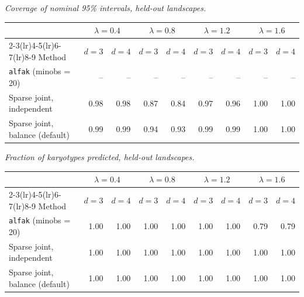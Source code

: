 \par\medskip\noindent\begin{minipage}{\linewidth}
\textit{Coverage of nominal 95\% intervals, held-out landscapes.}
\begin{center}
\footnotesize
\setlength{\tabcolsep}{3.5pt}
\begin{tabular}{l*{8}{r}}
\toprule
 & \multicolumn{2}{c}{$\lambda=0.4$} & \multicolumn{2}{c}{$\lambda=0.8$} & \multicolumn{2}{c}{$\lambda=1.2$} & \multicolumn{2}{c}{$\lambda=1.6$} \\
\cmidrule(lr){2-3}\cmidrule(lr){4-5}\cmidrule(lr){6-7}\cmidrule(lr){8-9}
Method & $d=3$ & $d=4$ & $d=3$ & $d=4$ & $d=3$ & $d=4$ & $d=3$ & $d=4$ \\
\midrule
\texttt{alfak} (minobs = 20) & -- & -- & -- & -- & -- & -- & -- & -- \\
Sparse joint, independent & 0.98 & 0.98 & 0.87 & 0.84 & 0.97 & 0.96 & 1.00 & 1.00 \\
Sparse joint, balance (default) & 0.99 & 0.99 & 0.94 & 0.93 & 0.99 & 0.99 & 1.00 & 1.00 \\
\bottomrule
\end{tabular}
\end{center}
\end{minipage}

\par\medskip\noindent\begin{minipage}{\linewidth}
\textit{Fraction of karyotypes predicted, held-out landscapes.}
\begin{center}
\footnotesize
\setlength{\tabcolsep}{3.5pt}
\begin{tabular}{l*{8}{r}}
\toprule
 & \multicolumn{2}{c}{$\lambda=0.4$} & \multicolumn{2}{c}{$\lambda=0.8$} & \multicolumn{2}{c}{$\lambda=1.2$} & \multicolumn{2}{c}{$\lambda=1.6$} \\
\cmidrule(lr){2-3}\cmidrule(lr){4-5}\cmidrule(lr){6-7}\cmidrule(lr){8-9}
Method & $d=3$ & $d=4$ & $d=3$ & $d=4$ & $d=3$ & $d=4$ & $d=3$ & $d=4$ \\
\midrule
\texttt{alfak} (minobs = 20) & 1.00 & 1.00 & 1.00 & 1.00 & 1.00 & 1.00 & 0.79 & 0.79 \\
Sparse joint, independent & 1.00 & 1.00 & 1.00 & 1.00 & 1.00 & 1.00 & 1.00 & 1.00 \\
Sparse joint, balance (default) & 1.00 & 1.00 & 1.00 & 1.00 & 1.00 & 1.00 & 1.00 & 1.00 \\
\bottomrule
\end{tabular}
\end{center}
\end{minipage}

